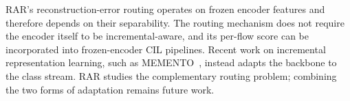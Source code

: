 RAR's reconstruction-error routing operates on frozen encoder features and therefore depends on their separability. The routing mechanism does not require the encoder itself to be incremental-aware, and its per-flow score can be incorporated into frozen-encoder CIL pipelines. Recent work on incremental representation learning, such as MEMENTO~\cite{memento2024}, instead adapts the backbone to the class stream. RAR studies the complementary routing problem; combining the two forms of adaptation remains future work.

